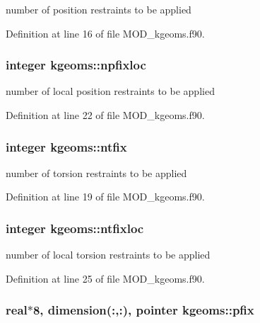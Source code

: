 number of position restraints to be applied 



Definition at line 16 of file M\-O\-D\-\_\-kgeoms.\-f90.

\hypertarget{classkgeoms_af961bd2102c0e750b416400a19714f59}{
\subsubsection[{npfixloc}]{\setlength{\rightskip}{0pt plus 5cm}integer kgeoms\-::npfixloc}}\label{classkgeoms_af961bd2102c0e750b416400a19714f59}


number of local position restraints to be applied 



Definition at line 22 of file M\-O\-D\-\_\-kgeoms.\-f90.

\hypertarget{classkgeoms_a9d25617fef534f2ace88078a587c6444}{
\subsubsection[{ntfix}]{\setlength{\rightskip}{0pt plus 5cm}integer kgeoms\-::ntfix}}\label{classkgeoms_a9d25617fef534f2ace88078a587c6444}


number of torsion restraints to be applied 



Definition at line 19 of file M\-O\-D\-\_\-kgeoms.\-f90.

\hypertarget{classkgeoms_a0036a81dba74f033a8902369ec7e96f7}{
\subsubsection[{ntfixloc}]{\setlength{\rightskip}{0pt plus 5cm}integer kgeoms\-::ntfixloc}}\label{classkgeoms_a0036a81dba74f033a8902369ec7e96f7}


number of local torsion restraints to be applied 



Definition at line 25 of file M\-O\-D\-\_\-kgeoms.\-f90.

\hypertarget{classkgeoms_ac883263077bf175682f2528e8a700021}{
\subsubsection[{pfix}]{\setlength{\rightskip}{0pt plus 5cm}real$\ast$8, dimension(\-:,\-:), pointer kgeoms\-::pfix}}\label{classkgeoms_ac883263077bf175682f2528e8a700021}


